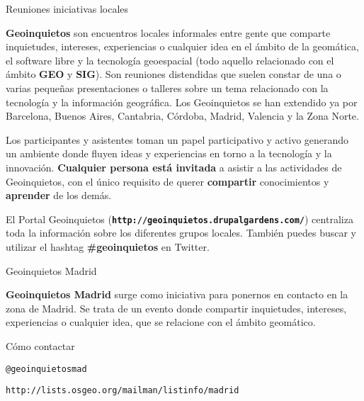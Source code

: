 \documentclass[11pt,a5]{article}
\newcommand{\web}[1]{\texttt{\color{VerdeOscuro2!50!black}\large #1}}
\newcommand{\alert}[1]{\textbf{\color{VerdeOscuro2!80!black}#1}}
\begin{document}
\begin{center}
\color{VerdeOscuro2!50!black}\Large Reuniones iniciativas locales
\end{center}

\alert{Geoinquietos} son encuentros locales informales entre gente que comparte
inquietudes, intereses, experiencias o cualquier idea en el ámbito de la
geomática, el software libre y la tecnología geoespacial (todo aquello
relacionado con el ámbito \alert{GEO} y \alert{SIG}). Son reuniones distendidas que suelen
constar de una o varias pequeñas presentaciones o talleres sobre un tema
relacionado con la tecnología y la información geográfica. Los Geoinquietos se
han extendido ya por Barcelona, Buenos Aires, Cantabria, Córdoba, Madrid,
Valencia y la Zona Norte.

Los participantes y asistentes toman un papel participativo y activo generando
un ambiente donde fluyen ideas y experiencias en torno a la tecnología y la
innovación.  \alert{Cualquier persona está invitada} a asistir a las actividades
de Geoinquietos, con el único requisito de querer \alert{compartir}
conocimientos y \alert{aprender} de los demás.

El Portal Geoinquietos (\alert{\texttt{http://geoinquietos.drupalgardens.com/}})
centraliza toda la información sobre los diferentes grupos locales. También
puedes buscar y utilizar el hashtag \alert{\#geoinquietos} en Twitter. 

\begin{center}
\color{VerdeOscuro2!50!black}\huge Geoinquietos Madrid
\end{center}

\alert{Geoinquietos Madrid} surge como iniciativa para ponernos en contacto en
la zona de Madrid. Se trata de un evento donde compartir inquietudes, intereses,
experiencias o cualquier idea, que se relacione con el ámbito geomático.

\begin{center}
\color{VerdeOscuro2!50!black}\Large Cómo contactar
\end{center}
\begin{center}
\begin{minipage}{0.3\textwidth}
  \begin{center} \large
    \begin{mdframed}[style=CajaContactos, frametitle={\Large\color{green!10!white} Twitter}]
      \web{@geoinquietosmad}
    \end{mdframed}
  \end{center}
\end{minipage}
%
\begin{minipage}{0.65\textwidth}
  \begin{center} \large
    \begin{mdframed}[style=CajaContactos, frametitle={\Large\color{green!10!white} Lista de correo}]
      \web{http://lists.osgeo.org/mailman/listinfo/madrid}
    \end{mdframed}
  \end{center}
\end{minipage}
  \end{center}
\end{document}
